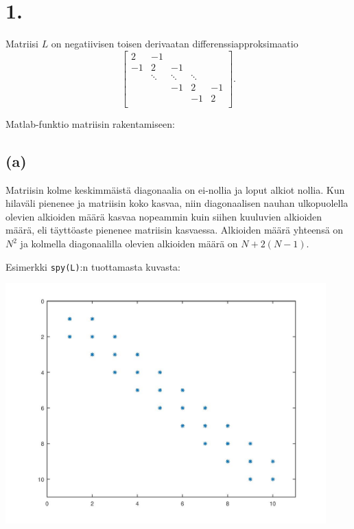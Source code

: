 \documentclass{article}
\title{}
\author{Mikael Myyrä}
\date{}
\begin{document}
\section*{1.}

Matriisi $L$ on negatiivisen toisen derivaatan differenssiapproksimaatio
\[
  \begin{bmatrix}
    2 & -1 \\
    -1 & 2 & -1 \\
       & \ddots & \ddots & \ddots \\
       & & -1 & 2 & -1 \\
       & & & -1 & 2 \\
  \end{bmatrix}.
\]

Matlab-funktio matriisin rakentamiseen:



\subsection*{(a)}

Matriisin kolme keskimmäistä diagonaalia on ei-nollia ja loput alkiot nollia.
Kun hilaväli pienenee ja matriisin koko kasvaa, niin diagonaalisen nauhan
ulkopuolella olevien alkioiden määrä kasvaa nopeammin kuin siihen kuuluvien
alkioiden määrä, eli täyttöaste pienenee matriisin kasvaessa. Alkioiden määrä
yhteensä on $N^2$ ja kolmella diagonaalilla olevien alkioiden määrä on
$N + 2(N - 1)$.

Esimerkki \verb#spy(L)#:n tuottamasta kuvasta:

\includegraphics[width=350pt]{w7_1a.jpg}
\end{document}
